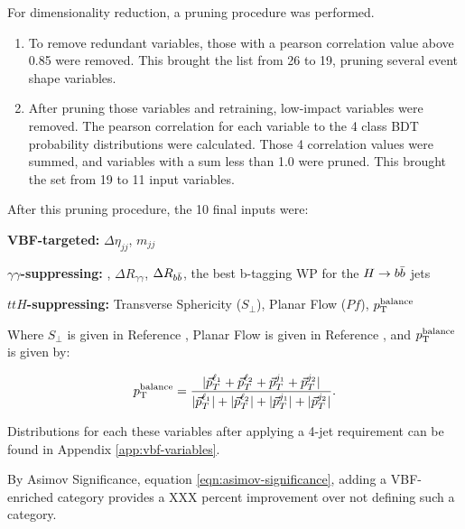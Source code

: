 For dimensionality reduction, a pruning procedure was performed.
\begin{enumerate}
  \item To remove redundant variables, those with a pearson correlation value above 0.85 were removed. This brought the list from 26 to 19, pruning several event shape variables.
  \item After pruning those variables and retraining, low-impact variables were removed. The pearson correlation for each variable to the 4 class BDT probability distributions were calculated. Those 4 correlation values were summed, and variables with a sum less than 1.0 were pruned. This brought the set from 19 to 11 input variables.
\end{enumerate}

After this pruning procedure, the 10 final inputs were: 

\textbf{VBF-targeted:} $\Delta \eta_{jj}$, $m_{jj}$

\textbf{$\gamma \gamma$-suppressing:} \myybb, $\Delta R_{\gamma\gamma}$, $\Delta R_{b\bar{b}}$, the best b-tagging WP for the $H\rightarrow b\bar{b}$ jets

\textbf{$ttH$-suppressing:} Transverse Sphericity ($S_{\perp}$), Planar Flow ($Pf$), $p_{\text{T}}^\text{balance}$

Where $S_{\perp}$ is given in Reference \cite{STDM-2011-33}, Planar Flow is given in Reference \cite{planar-flow}, and $p_{\text{T}}^\text{balance}$ is given by:

\begin{equation} \label{eqn:pt-balance}
    p_{\text{T}}^\text{balance} = \frac
    {| \vec{p}_T^{\ell_1} + \vec{p}_T^{\ell_2} + \vec{p}_T^{j_1} +  \vec{p}_T^{j_2}|}
    {|\vec{p}_T^{\ell_1}| + |\vec{p}_T^{\ell_2}| + |\vec{p}_T^{j_1}| +  |\vec{p}_T^{j_2}|}.
\end{equation}


Distributions for each these variables after applying a 4-jet requirement can be found in Appendix \ref{app:vbf-variables}.

By Asimov Significance, equation \ref{eqn:asimov-significance}, adding a VBF-enriched category provides a XXX percent improvement over not defining such a category.


